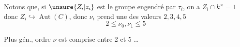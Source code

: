 Notons que, si $\unsure{Z_i|z_i}$  est le groupe engendré par $\tau_i$, on a $Z_i\cap k^\times=1$ donc $Z_i\hookrightarrow\operatorname{Aut}(C)$, donc $\nu_i$ prend une des valeurs $2,3,4,5$
\[
2\leq\nu_0,\nu_1\leq5
\]

 Plus gén.,    ordre $\nu$ est comprise entre 2 et 5 \ldots
